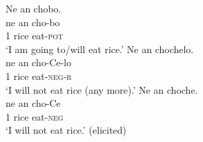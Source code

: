 \documentclass[output=paper,colorlinks,citecolor=brown]{langscibook}
\begin{document}

\ea\label{ex:amr:6}
    \ea\label{ex:amr:6a} Ne an chobo.  \\ 
        \gll ne an cho-bo \\
               1 rice eat-\textsc{pot} \\
        \glt ‘I am going to/will eat rice.’ 
    \ex\label{ex:amr:6b} Ne an chochelo. \\
        \gll ne an cho-Ce-lo \\
              1 rice eat-\textsc{neg}{}-\textsc{r}\\
        \glt  ‘I will not eat rice (any more).’ 
    \ex\label{ex:amr:6c} Ne an choche. \\
        \gll ne an cho-Ce\\
              1 rice eat-\textsc{neg} \\
        \glt ‘I will not eat rice.’ (elicited)
    \z
\z 
\end{document}
